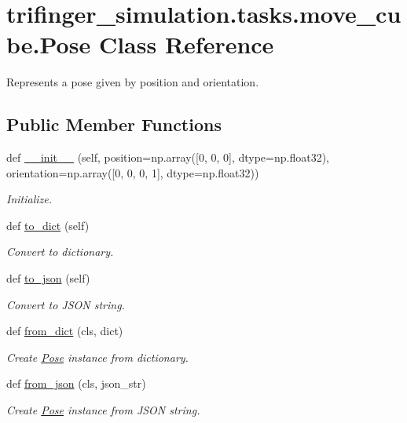 \hypertarget{classtrifinger__simulation_1_1tasks_1_1move__cube_1_1Pose}{}\section{trifinger\+\_\+simulation.\+tasks.\+move\+\_\+cube.\+Pose Class Reference}
\label{classtrifinger__simulation_1_1tasks_1_1move__cube_1_1Pose}


Represents a pose given by position and orientation.  


\subsection*{Public Member Functions}
\begin{DoxyCompactItemize}
\item 
def \hyperlink{classtrifinger__simulation_1_1tasks_1_1move__cube_1_1Pose_a96a9d2e3937aa6eb7b1c6b9ac1b56eeb}{\+\_\+\+\_\+init\+\_\+\+\_\+} (self, position=np.\+array(\mbox{[}0, 0, 0\mbox{]}, dtype=np.\+float32), orientation=np.\+array(\mbox{[}0, 0, 0, 1\mbox{]}, dtype=np.\+float32))
\begin{DoxyCompactList}\small\item\em Initialize. \end{DoxyCompactList}\item 
def \hyperlink{classtrifinger__simulation_1_1tasks_1_1move__cube_1_1Pose_a6c289faff4a6bb495580fe3851b7bdac}{to\+\_\+dict} (self)
\begin{DoxyCompactList}\small\item\em Convert to dictionary. \end{DoxyCompactList}\item 
def \hyperlink{classtrifinger__simulation_1_1tasks_1_1move__cube_1_1Pose_ad7c514c49a45c669e4b22874a33d34f5}{to\+\_\+json} (self)
\begin{DoxyCompactList}\small\item\em Convert to J\+S\+ON string. \end{DoxyCompactList}\item 
def \hyperlink{classtrifinger__simulation_1_1tasks_1_1move__cube_1_1Pose_a79bcc0819ca44da25ddc16973a001880}{from\+\_\+dict} (cls, dict)
\begin{DoxyCompactList}\small\item\em Create \hyperlink{classtrifinger__simulation_1_1tasks_1_1move__cube_1_1Pose}{Pose} instance from dictionary. \end{DoxyCompactList}\item 
def \hyperlink{classtrifinger__simulation_1_1tasks_1_1move__cube_1_1Pose_a26062907cc8a9ddcbea181a0eb0510e5}{from\+\_\+json} (cls, json\+\_\+str)
\begin{DoxyCompactList}\small\item\em Create \hyperlink{classtrifinger__simulation_1_1tasks_1_1move__cube_1_1Pose}{Pose} instance from J\+S\+ON string. \end{DoxyCompactList}\end{DoxyCompactItemize}
